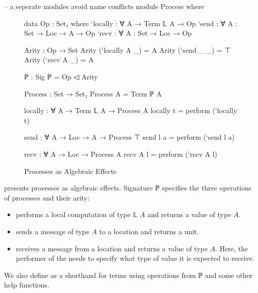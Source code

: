 \begin{code}[hide]
-- a seperate modules avoid name conflicts
module Process where
\end{code}

\begin{figure}[ht]

\begin{minipage}{.45\textwidth}
  \begin{center}\begin{code}
  data Op : Set₁ where
    `locally : ∀ {A} → Term 𝕃 A → Op
    `send    : ∀ {A : Set} → Loc → A → Op
    `recv    : ∀ {A : Set} → Loc → Op

  Arity : Op → Set
  Arity (`locally {A} _) = A
  Arity (`send _ _) = ⊤
  Arity (`recv {A} _) = A

  ℙ : Sig
  ℙ = Op ◁ Arity
  \end{code}\end{center}
\end{minipage}
\hfill\vline\hfill
\begin{minipage}{.45\textwidth}
  \begin{center}\begin{code}
  Process : Set → Set₁
  Process A = Term ℙ A

  locally : ∀ {A} → Term 𝕃 A → Process A
  locally t = perform (`locally t)

  send : ∀ {A} → Loc → A → Process ⊤
  send l a = perform (`send l a)

  recv : ∀ {A} → Loc → Process A
  recv {A} l = perform (`recv {A} l)
  \end{code}\end{center}
\end{minipage}

\caption{Processes as Algebraic Effects}
\label{fig:process}
\end{figure}

 presents processes as algebraic effects.
%
Signature ℙ specifies the three operations of processes and their arity:
%
\begin{itemize}
\item
   performs a local computation of type  𝕃 $A$ and returns a value of type $A$.
\item
   sends a message of type $A$ to a location and returns a unit.
\item
   receives a message from a location and returns a value of type $A$.
  Here, the performer of the  needs to specify what type of value it is expected to receive.
\end{itemize}
%
We also define  as a shorthand for terms using operations from ℙ and some other help functions.
